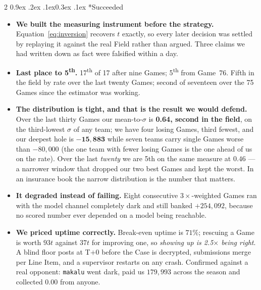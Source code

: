 \documentclass[9pt,a4paper,twocolumn]{article}
\makeatletter
\renewcommand\subsection{\@startsection{subsection}{2}{\z@}%
  {0.9ex \@plus .2ex \@minus .1ex}{0.3ex \@plus .1ex}%
  {\normalfont\small\bfseries}}
\newcommand{\fair}{t}
\makeatother
\begin{document}
\begin{multicols}{2}
\subsection*{Succeeded}
\begin{itemize}
\item \textbf{We built the measuring instrument before the strategy.} Equation~\eqref{eq:inversion}
recovers $\fair$ exactly, so every later decision was settled by replaying it against the real
Field rather than argued. Three claims we had written down as fact were falsified within a day.
\item \textbf{Last place to 5\textsuperscript{th}.} 17\textsuperscript{th} of 17 after nine Games;
5\textsuperscript{th} from Game~76. Fifth in the field by rate over the last twenty Games; second
of seventeen over the 75 Games since the estimator was working.
\item \textbf{The distribution is tight, and that is the result we would defend.} Over the last
thirty Games our mean-to-$\sigma$ is \textbf{0.64, second in the field}, on the third-lowest
$\sigma$ of any team; we have four losing Games, third fewest, and our deepest hole is
$\mathbf{-15{,}883}$ while seven teams carry single Games worse than $-80{,}000$ (the one team with
fewer losing Games is the one ahead of us on the rate). Over the last \emph{twenty} we are 5th on the
same measure at $0.46$ --- a narrower window that dropped our two best Games and kept the worst. In an insurance book
the narrow distribution is the number that matters.
\item \textbf{It degraded instead of failing.} Eight consecutive $3\times$-weighted Games ran with
the model channel completely dark and still banked $+254{,}092$, because no scored number ever
depended on a model being reachable.
\item \textbf{We priced uptime correctly.} Break-even uptime is $71\%$; rescuing a Game is worth
$93\fair$ against $37\fair$ for improving one, so \emph{showing up is 2.5$\times$ being right}. A
blind floor posts at T$+$0 before the Case is decrypted, submissions merge per Line Item, and a
supervisor restarts on any crash. Confirmed against a real opponent: \texttt{makalu} went dark,
paid us $179{,}993$ across the season and collected $0.00$ from anyone.
\end{itemize}


\end{multicols}
\end{document}
